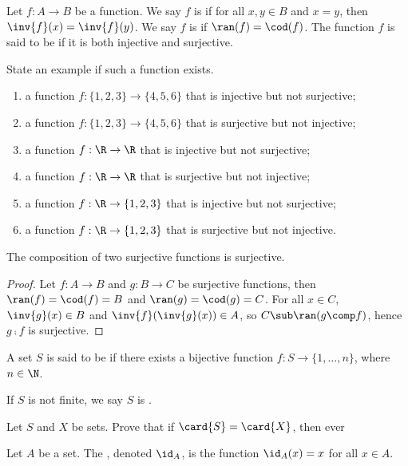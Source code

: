 \documentclass[10pt]{article}
\begin{document}
\begin{definition}
    Let $f:A\to B$ be a function. We say $f$ is  if for all $x,y\in B$ and $x=y$, then $\inv{f}(x)=\inv{f}(y)$. We say $f$ is  if $\ran(f)=\cod(f)$. The function $f$ is said to be  if it is both injective and surjective.
\end{definition}
\begin{problem}
    State an example if such a function exists.
    \begin{enumerate}
        \item a function $f:\{1,2,3\}\to\{4,5,6\}$ that is injective but not surjective;
        \item a function $f:\{1,2,3\}\to\{4,5,6\}$ that is surjective but not injective;
        \item a function $f:\R\to\R$ that is injective but not surjective;
        \item a function $f:\R\to\R$ that is surjective but not injective;
        \item a function $f:\R\to\{1,2,3\}$ that is injective but not surjective;
        \item a function $f:\R\to\{1,2,3\}$ that is surjective but not injective.
    \end{enumerate}
\end{problem}
\begin{proposition}
    The composition of two surjective functions is surjective.
\end{proposition}
\begin{proof}
    Let $f:A\to B$ and $g:B\to C$ be surjective functions, then $\ran(f)=\cod(f)=B$ and $\ran(g)=\cod(g)=C$. For all $x\in C$, $\inv{g}(x)\in B$ and $\inv{f}(\inv{g}(x))\in A$, so $C\sub\ran(g\comp f)$, hence $g\comp f$ is surjective.
\end{proof}
\begin{problem}
    
\end{problem}
\begin{definition}
    A set $S$ is said to be  if there exists a bijective function $f:S\to\{1,\dots,n\}$, where $n\in\N$. 

    If $S$ is not finite, we say $S$ is .
\end{definition}
\begin{problem}
    Let $S$ and $X$ be sets. Prove that if $\card{S}=\card{X}$, then ever 
\end{problem}
\begin{definition}
    Let $A$ be a set. The , denoted ${\id}_{A}$, is the function ${\id}_{A}(x)=x$ for all $x\in A$.
\end{definition}
\end{document}
